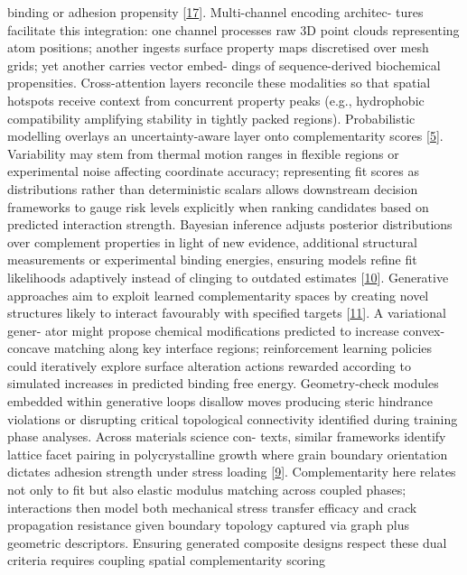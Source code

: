 \documentclass[
]{article}
\begin{document}
binding or adhesion propensity {[}\hyperref[_bookmark57]{17}{]}.
Multi-channel encoding architec- tures facilitate this integration: one
channel processes raw 3D point clouds representing atom positions;
another ingests surface property maps discretised over mesh grids; yet
another carries vector embed- dings of sequence-derived biochemical
propensities. Cross-attention layers reconcile these modalities so that
spatial hotspots receive context from concurrent property peaks (e.g.,
hydrophobic compatibility amplifying stability in tightly packed
regions). Probabilistic modelling overlays an uncertainty-aware layer
onto complementarity scores {[}\hyperref[_bookmark45]{5}{]}. Variability
may stem from thermal motion ranges in flexible regions or experimental
noise affecting coordinate accuracy; representing fit scores as
distributions rather than deterministic scalars allows downstream
decision frameworks to gauge risk levels explicitly when ranking
candidates based on predicted interaction strength. Bayesian inference
adjusts posterior distributions over complement properties in light of
new evidence, additional structural measurements or experimental binding
energies, ensuring models refine fit likelihoods adaptively instead of
clinging to outdated estimates {[}\hyperref[_bookmark50]{10}{]}.
Generative approaches aim to exploit learned complementarity spaces by
creating novel structures likely to interact favourably with specified
targets {[}\hyperref[_bookmark51]{11}{]}. A variational gener- ator
might propose chemical modifications predicted to increase
convex-concave matching along key interface regions; reinforcement
learning policies could iteratively explore surface alteration actions
rewarded according to simulated increases in predicted binding free
energy. Geometry-check modules embedded within generative loops disallow
moves producing steric hindrance violations or disrupting critical
topological connectivity identified during training phase analyses.
Across materials science con- texts, similar frameworks identify lattice
facet pairing in polycrystalline growth where grain boundary orientation
dictates adhesion strength under stress loading
{[}\hyperref[_bookmark49]{9}{]}. Complementarity here relates not only
to fit but also elastic modulus matching across coupled phases;
interactions then model both mechanical stress transfer efficacy and
crack propagation resistance given boundary topology captured via graph
plus geometric descriptors. Ensuring generated composite designs respect
these dual criteria requires coupling spatial complementarity scoring
\end{document}
